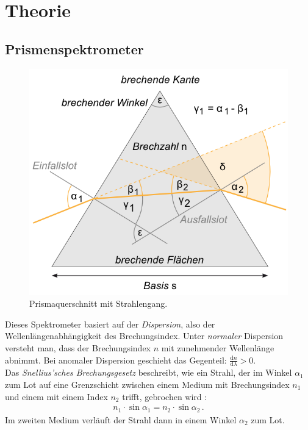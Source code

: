 \documentclass[12pt,a4paper,titlepage,headinclude,bibtotoc]{scrartcl}
\newcommand{\dif}{\ensuremath{\mathrm{d}}}
\begin{document}
\section{Theorie}
\label{sec:theorie}
\subsection{Prismenspektrometer}

\begin{figure}[!h]
	\centering
	\includegraphics[scale=0.6]{Prisma.png}
	\caption{Prismaquerschnitt mit Strahlengang. \cite[Datum: 28.12.2014]{LP19}}
	\label{fig:prisma}
\end{figure}
Dieses Spektrometer basiert auf der \textit{Dispersion}, also der Wellenlängenabhängigkeit des Brechungsindex.
Unter \textit{normaler} Dispersion versteht man, dass der Brechungsindex $n$ mit zunehmender Wellenlänge abnimmt.
Bei anomaler Dispersion geschieht das Gegenteil: $\frac{\dif n}{\dif \lambda} > 0$.\\

Das \emph{Snellius'sches Brechungsgesetz} beschreibt, wie ein Strahl, der im Winkel $\alpha_1$ zum Lot auf eine Grenzschicht zwischen einem Medium mit Brechungsindex $n_1$ und einem mit einem Index $n_2$ trifft, gebrochen wird \cite[S.101]{hecht}:
\begin{align}
	n_1 \cdot \sin \alpha_1 = n_2 \cdot \sin \alpha_2 \,.
	\label{eq:Snellius} 
\end{align}
Im zweiten Medium verläuft der Strahl dann in einem Winkel $\alpha_2$ zum Lot.\\
\end{document}
